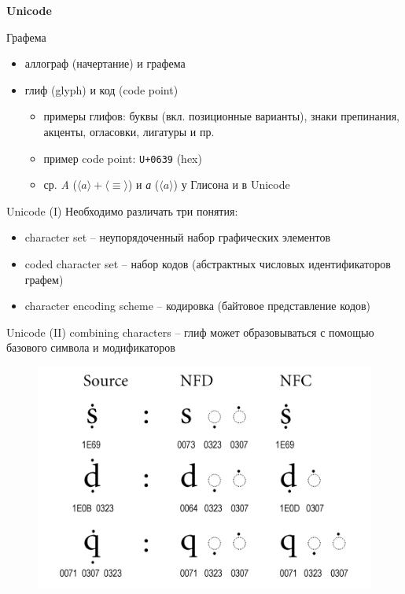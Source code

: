 \documentclass{beamer}
\begin{document}
\begin{frame}{}
\begin{center}
	\textbf{Unicode}
\end{center}
\end{frame}

\begin{frame}{Графема}
\begin{itemize}
	\item аллограф (начертание) и графема
	\item глиф (glyph) и код (code point)
	    \begin{itemize}
	        \item примеры глифов: буквы (вкл. позиционные варианты), знаки препинания, акценты, огласовки, лигатуры и пр.
            \item пример code point: \texttt{U+0639} (hex)
	        \item ср. \textit{A} ($\langle a \rangle + \langle \equiv \rangle$) и \textit{а} ($\langle a \rangle$) у Глисона  и в Unicode
	    \end{itemize}
\end{itemize}
\end{frame}

\begin{frame}{Unicode (I)}
Необходимо различать три понятия:\\
\bigskip
\begin{itemize}
	\item character set -- неупорядоченный набор графических элементов
	\item coded character set -- набор кодов (абстрактных числовых идентификаторов графем)
	\item character encoding scheme -- кодировка (байтовое представление кодов)
\end{itemize}
\end{frame}

\begin{frame}{Unicode (II)}
combining characters -- глиф может образовываться с помощью базового символа и модификаторов\\
\medskip
\begin{figure}[H]
    \includegraphics[scale=0.4]{combining.png} 
\end{figure}
\end{frame}
\end{document}
